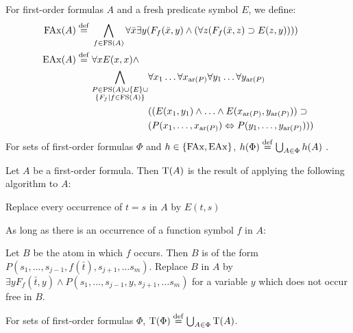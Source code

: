 \begin{defi}
	For first-order formulas $A$ and a fresh predicate symbol $E$, we define:\nopagebreak
	\begin{align*}
		\mathrm{FAx}(A) \stackrel{\mathrm{def}}{=}{} &\bigwedge_{f \in \mathrm{FS}(A)}  \forall \bar x \exists y (F_f(\bar x, y) \land (\forall z (F_f(\bar x, z) \supset E(z, y)))) \\
		\mathrm{EAx}(A) \stackrel{\mathrm{def}}{=}{} & \forall x E(x,x)\land  \\
																		 & \begin{aligned} \bigwedge_{\substack{P \in\mathrm{PS}(A)\cup\{E\}\cup\\ \{F_f\mid f\in \mathrm{FS}(A)\}}} &\forall x_1 \ldots \forall x_{\mathrm{ar}(P)} \forall y_1 \ldots \forall y_{\mathrm{ar}(P)} \\
																		 & (( E(x_1,y_1) \land \ldots \land E(x_{\mathrm{ar}(P)},  y_{\mathrm{ar}(P)})) \supset  \\
																 &  (P(x_1, \ldots, x_{\mathrm{ar}(P)}) \Leftrightarrow P(y_1, \ldots, y_{\mathrm{ar}(P)}) ) ) \end{aligned} 
\end{align*}
For sets of first-order formulas $\Phi$ and $h \in \{\mathrm{FAx}, \mathrm{EAx}\}$, $h(\Phi) \stackrel{\mathrm{def}}{=} \bigcup_{A\in \Phi} h(A)$ .
\end{defi}

\begin{defi}
	\label{def:trans}
	Let $A$ be a first-order formula. Then $\mathrm{T}(A)$ is the result of applying the following algorithm to $A$:
	\begin{compactenum}
	\item Replace every occurrence of $t=s$ in $A$ by $E(t, s)$
	\label{def:trans_step1}
	\item As long as there is an occurrence of a function symbol $f$ in $A$:
	\label{def:trans_step2}

		Let $B$ be the atom in which $f$ occurs.
		\newline Then $B$ is of the form $P(s_1, \ldots, s_{j-1}, f(\bar t),\allowbreak s_{j+1}, \ldots s_m)$.
		\newline Replace $B$ in $A$ by $\exists y F_f(\bar t, y) \land P(s_1, \ldots, s_{j-1}, y, s_{j+1}, \ldots s_m)$ for a variable $y$ which does not occur free in $B$.
	\end{compactenum}

	For sets of first-order formulas $\Phi$, $\mathrm{T}(\Phi) \stackrel{\mathrm{def}}{=} \bigcup_{A\in\Phi} \mathrm{T}(A)$.
\end{defi}

